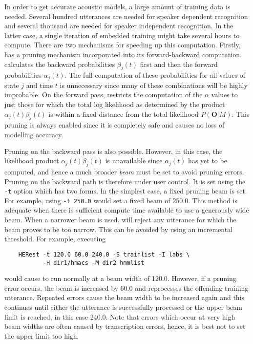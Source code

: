 In order to get accurate acoustic models, a large amount of training
data is needed.  Several hundred
utterances are needed for speaker dependent recognition and
several thousand are needed for
speaker independent recognition.  In the latter case, a single
iteration of embedded training
might take several hours to compute.  There are two mechanisms for 
speeding up this computation.  Firstly,  has a pruning
 mechanism
incorporated into its forward-backward computation.   calculates
the backward probabilities $\beta_j(t)$ first and then the forward probabilities
$\alpha_j(t)$.
The full computation of these probabilities for all values of state $j$
and time $t$ is unnecessary since many of these combinations will be highly
improbable.   On the forward pass,  restricts the computation of
the $\alpha$ values to just those for which the total log likelihood 
as determined by the product $\alpha_j(t)\beta_j(t)$ is
within a fixed distance from the total likelihood $P(\bm{O}|M)$.  This
pruning is always enabled since it is completely safe and causes no loss
of modelling accuracy.  

Pruning on the backward pass is also possible.
However, in this case, the likelihood product $\alpha_j(t)\beta_j(t)$
is unavailable since $\alpha_j(t)$ has yet to be computed, and hence a 
much broader {\it beam} must be set to
avoid pruning errors.  Pruning on the backward path is therefore under
user control. It is set using the \texttt{-t} option which has two 
forms.  In the simplest case, a fixed pruning beam is set.  For example,
using \texttt{-t 250.0} would set a fixed beam of 250.0.  This method
is adequate when there is sufficient compute time available to 
use a generously wide beam.  When a narrower beam is used,  will 
reject any utterance for which the beam proves to be too narrow.
This can be avoided by using an incremental threshold.  For example,
executing 
\begin{verbatim}
    HERest -t 120.0 60.0 240.0 -S trainlist -I labs \
           -H dir1/hmacs -M dir2 hmmlist
\end{verbatim}
would cause  to run normally
at a beam width of 120.0.  However, if a pruning 
error\index{pruning errors} occurs, the
beam is increased by 60.0 and  reprocesses the offending training
utterance.  Repeated errors cause the beam width to be increased
again and this continues until either the utterance is 
successfully processed or the upper beam limit is reached, in this
case 240.0.  Note that errors which occur at very high beam widths
are often caused by transcription errors, hence, it is best not to
set the upper limit too high.

